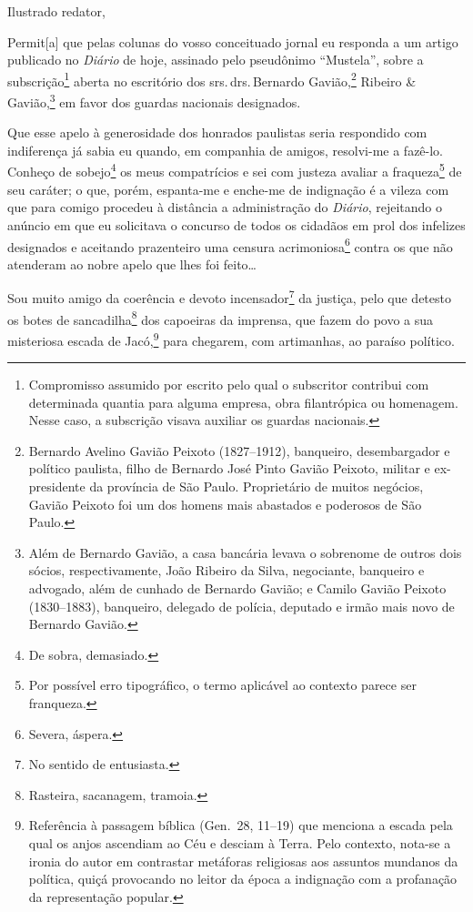 Ilustrado redator,

Permit{[}a{]} que pelas colunas do vosso conceituado jornal eu responda
a um artigo publicado no \emph{Diário} de hoje, assinado pelo pseudônimo
``Mustela'', sobre a subscrição\footnote{Compromisso assumido por
  escrito pelo qual o subscritor contribui com determinada quantia para
  alguma empresa, obra filantrópica ou homenagem. Nesse caso, a
  subscrição visava auxiliar os guardas nacionais.} aberta no escritório
dos srs.\,drs.\,Bernardo Gavião,\footnote{Bernardo Avelino Gavião Peixoto
  (1827--1912), banqueiro, desembargador e político paulista, filho de
  Bernardo José Pinto Gavião Peixoto, militar e ex-presidente da
  província de São Paulo. Proprietário de muitos negócios, Gavião
  Peixoto foi um dos homens mais abastados e poderosos de São Paulo.}
Ribeiro \& Gavião,\footnote{Além de Bernardo Gavião, a casa bancária
  levava o sobrenome de outros dois sócios, respectivamente, João
  Ribeiro da Silva, negociante, banqueiro e advogado, além de cunhado de
  Bernardo Gavião; e Camilo Gavião Peixoto (1830--1883), banqueiro,
  delegado de polícia, deputado e irmão mais novo de Bernardo Gavião.}
em favor dos guardas nacionais designados.

Que esse apelo à generosidade dos honrados paulistas seria respondido
com indiferença já sabia eu quando, em companhia de amigos, resolvi-me a
fazê-lo. Conheço de sobejo\footnote{De sobra, demasiado.} os meus
compatrícios e sei com justeza avaliar a fraqueza\footnote{Por
  possível erro tipográfico, o termo aplicável ao contexto parece ser
  franqueza.} de seu caráter; o que, porém, espanta-me e enche-me de
indignação é a vileza com que para comigo procedeu à distância a
administração do \emph{Diário}, rejeitando o anúncio em que eu
solicitava o concurso de todos os cidadãos em prol dos infelizes
designados e aceitando prazenteiro uma censura acrimoniosa\footnote{
  Severa, áspera.} contra os que não atenderam ao nobre apelo que lhes
foi feito\ldots{}

Sou muito amigo da coerência e devoto incensador\footnote{No sentido
  de entusiasta.} da justiça, pelo que detesto os botes de
sancadilha\footnote{Rasteira, sacanagem, tramoia.} dos capoeiras da
imprensa, que fazem do povo a sua misteriosa escada de Jacó,\footnote{
  Referência à passagem bíblica (Gen.~28, 11--19) que menciona a escada
  pela qual os anjos ascendiam ao Céu e desciam à Terra. Pelo contexto,
  nota-se a ironia do autor em contrastar metáforas religiosas aos
  assuntos mundanos da política, quiçá provocando no leitor da época a
  indignação com a profanação da representação popular.} para chegarem,
com artimanhas, ao paraíso político.

